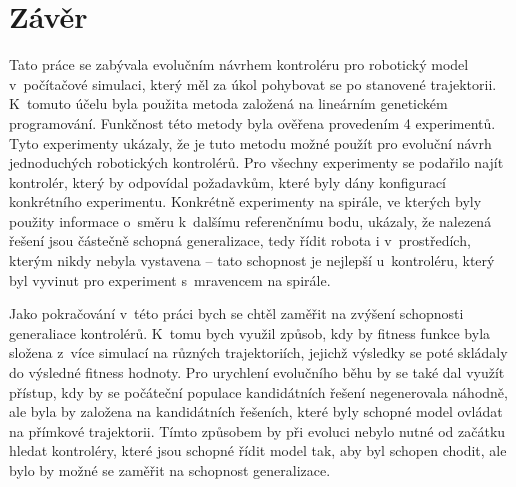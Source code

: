 \chapter{Závěr}
\label{chap:zaver}
Tato práce se zabývala evolučním návrhem kontroléru pro robotický model v~počítačové simulaci, který měl za úkol pohybovat se po stanovené trajektorii.
K~tomuto účelu byla použita metoda založená na lineárním genetickém programování.
Funkčnost této metody byla ověřena provedením 4 experimentů.
Tyto experimenty ukázaly, že je tuto metodu možné použít pro evoluční návrh jednoduchých robotických kontrolérů.
Pro všechny experimenty se podařilo najít kontrolér, který by odpovídal požadavkům, které byly dány konfigurací konkrétního experimentu.
Konkrétně experimenty na spirále, ve kterých byly použity informace o~směru k~dalšímu referenčnímu bodu, ukázaly, že nalezená řešení jsou částečně schopná generalizace, tedy řídit robota i v~prostředích, kterým nikdy nebyla vystavena -- tato schopnost je nejlepší u~kontroléru, který byl vyvinut pro experiment s~mravencem na spirále.

Jako pokračování v~této práci bych se chtěl zaměřit na zvýšení schopnosti generaliace kontrolérů.
K~tomu bych využil způsob, kdy by fitness funkce byla složena z~více simulací na různých trajektoriích, jejichž výsledky se poté skládaly do výsledné fitness hodnoty.
Pro urychlení evolučního běhu by se také dal využít přístup, kdy by se počáteční populace kandidátních řešení negenerovala náhodně, ale byla by založena na kandidátních řešeních, které byly schopné model ovládat na přímkové trajektorii.
Tímto způsobem by při evoluci nebylo nutné od začátku hledat kontroléry, které jsou schopné řídit model tak, aby byl schopen chodit, ale bylo by možné se zaměřit na schopnost generalizace.

